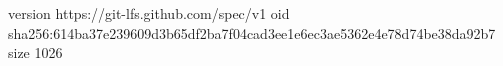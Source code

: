 version https://git-lfs.github.com/spec/v1
oid sha256:614ba37e239609d3b65df2ba7f04cad3ee1e6ec3ae5362e4e78d74be38da92b7
size 1026
